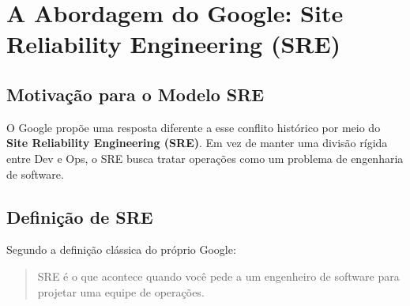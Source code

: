 \documentclass[12pt,a4paper]{report}
\begin{document}
\section{A Abordagem do Google: Site Reliability Engineering (SRE)} \cite{beyer2016sre, beyer2018workbook}

\subsection{Motivação para o Modelo SRE}

O Google propõe uma resposta diferente a esse conflito histórico por meio do
\textbf{Site Reliability Engineering (SRE)}. Em vez de manter uma divisão rígida
entre Dev e Ops, o SRE busca tratar operações como um problema de engenharia
de software.

\subsection{Definição de SRE}

Segundo a definição clássica do próprio Google:
\begin{quote}
SRE é o que acontece quando você pede a um engenheiro de software para
projetar uma equipe de operações.
\end{quote}
\end{document}
